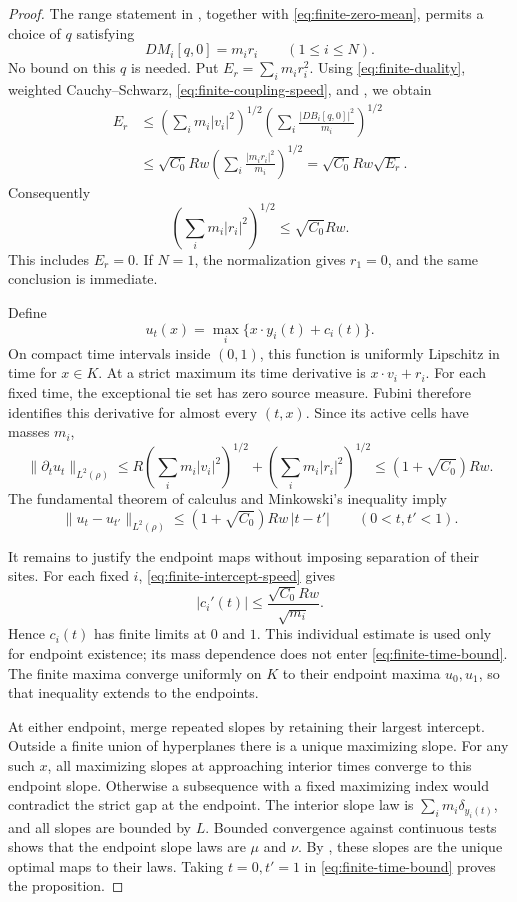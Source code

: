 \begin{proof}
The range statement in , together with
\eqref{eq:finite-zero-mean}, permits a choice of \(q\) satisfying
\[
 DM_i[q,0]=m_ir_i\qquad(1\le i\le N).
\]
No bound on this \(q\) is needed. Put \(E_r=\sum_i m_ir_i^2\).
Using \eqref{eq:finite-duality}, weighted Cauchy--Schwarz,
\eqref{eq:finite-coupling-speed}, and , we obtain
\[
 \begin{split}
 E_r
 &\le
 \left(\sum_i m_i|v_i|^2\right)^{1/2}
 \left(\sum_i\frac{|DB_i[q,0]|^2}{m_i}\right)^{1/2}\\
 &\le \sqrt{C_0}Rw
       \left(\sum_i\frac{|m_ir_i|^2}{m_i}\right)^{1/2}
 =\sqrt{C_0}Rw\sqrt{E_r}.
 \end{split}
\]
Consequently
\begin{equation}
 \left(\sum_i m_i|r_i|^2\right)^{1/2}
 \le\sqrt{C_0}Rw.
 \label{eq:finite-intercept-speed}
\end{equation}
This includes \(E_r=0\). If \(N=1\), the normalization gives \(r_1=0\),
and the same conclusion is immediate.

Define
\[
 u_t(x)=\max_i\{x\cdot y_i(t)+c_i(t)\}.
\]
On compact time intervals inside \((0,1)\), this function is uniformly
Lipschitz in time for \(x\in K\). At a strict maximum its time derivative
is \(x\cdot v_i+r_i\). For each fixed time, the exceptional tie set has
zero source measure. Fubini therefore identifies this derivative for
almost every \((t,x)\). Since its active cells have masses \(m_i\),
\[
 \|\partial_tu_t\|_{L^2(\rho)}
 \le R\left(\sum_i m_i|v_i|^2\right)^{1/2}
     +\left(\sum_i m_i|r_i|^2\right)^{1/2}
 \le(1+\sqrt{C_0})Rw.
\]
The fundamental theorem of calculus and Minkowski's inequality imply
\begin{equation}
 \|u_t-u_{t'}\|_{L^2(\rho)}
 \le(1+\sqrt{C_0})Rw\,|t-t'|
 \qquad(0<t,t'<1).
 \label{eq:finite-time-bound}
\end{equation}

It remains to justify the endpoint maps without imposing separation of
their sites. For each fixed \(i\), \eqref{eq:finite-intercept-speed}
gives
\[
 |c_i'(t)|\le\frac{\sqrt{C_0}Rw}{\sqrt{m_i}}.
\]
Hence \(c_i(t)\) has finite limits at \(0\) and \(1\). This individual
estimate is used only for endpoint existence; its mass dependence
does not enter \eqref{eq:finite-time-bound}. The finite maxima converge
uniformly on \(K\) to their endpoint maxima \(u_0,u_1\), so that
inequality extends to the endpoints.

At either endpoint, merge repeated slopes by retaining their largest
intercept. Outside a finite union of hyperplanes there is a unique
maximizing slope. For any such \(x\), all maximizing slopes at
approaching interior times converge to this endpoint slope. Otherwise
a subsequence with a fixed maximizing index would contradict the
strict gap at the endpoint. The interior slope law is
\(\sum_i m_i\delta_{y_i(t)}\), and all slopes are bounded by \(L\).
Bounded convergence against continuous tests shows that the endpoint
slope laws are \(\mu\) and \(\nu\). By , these
slopes are the unique optimal maps to their laws. Taking \(t=0,t'=1\)
in \eqref{eq:finite-time-bound} proves the proposition.
\end{proof}

